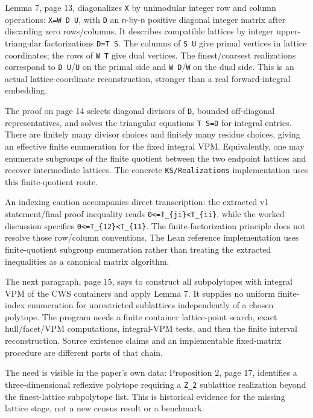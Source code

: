 \documentclass[11pt,a4paper,oneside]{report}
\begin{document}
Lemma 7, page 13, diagonalizes \texttt{X} by unimodular integer row and
column operations: \texttt{X=\allowbreak{}W D U}, with \texttt{D} an
\texttt{n}-by-\texttt{n} positive diagonal integer matrix after
discarding zero rows/columns. It describes compatible lattices by
integer upper-triangular factorizations \texttt{D=\allowbreak{}T S}. The
columns of \texttt{S U} give primal vertices in lattice coordinates; the
rows of \texttt{W T} give dual vertices. The finest/coarsest
realizations correspond to \texttt{D U}/\texttt{U} on the primal side
and \texttt{W D}/\texttt{W} on the dual side. This is an actual
lattice-coordinate reconstruction, stronger than a real forward-integral
embedding.

The proof on page 14 selects diagonal divisors of \texttt{D}, bounded
off-diagonal representatives, and solves the triangular equations
\texttt{T S=\allowbreak{}D} for integral entries. There are finitely
many divisor choices and finitely many residue choices, giving an
effective finite enumeration for the fixed integral VPM. Equivalently,
one may enumerate subgroups of the finite quotient between the two
endpoint lattices and recover intermediate lattices. The concrete
\texttt{KS/\allowbreak{}Realizat\allowbreak{}ions} implementation uses
this finite-quotient route.

An indexing caution accompanies direct transcription: the extracted v1
statement/final proof inequality reads
\texttt{0<=\allowbreak{}T\_\allowbreak{}\{ji\}<T\_\allowbreak{}\{ii\}},
while the worked discussion specifies
\texttt{0<=\allowbreak{}T\_\allowbreak{}\{12\}<T\_\allowbreak{}\{11\}}.
The finite-factorization principle does not resolve those row/column
conventions. The Lean reference implementation uses finite-quotient
subgroup enumeration rather than treating the extracted inequalities as
a canonical matrix algorithm.

The next paragraph, page 15, says to construct all subpolytopes with
integral VPM of the CWS containers and apply Lemma 7. It supplies no
uniform finite-index enumeration for unrestricted sublattices
independently of a chosen polytope. The program needs a finite container
lattice-point search, exact hull/facet/VPM computations, integral-VPM
tests, and then the finite interval reconstruction. Source existence
claims and an implementable fixed-matrix procedure are different parts
of that chain.

The need is visible in the paper's own data: Proposition 2, page 17,
identifies a three-dimensional reflexive polytope requiring a
\texttt{Z\_\allowbreak{}2} sublattice realization beyond the
finest-lattice subpolytope list. This is historical evidence for the
missing lattice stage, not a new census result or a benchmark.
\end{document}
